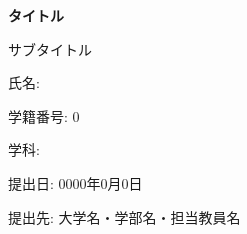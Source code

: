 \documentclass[a4paper,12pt]{article}
\begin{document}
\begin{titlepage}
    \centering
    
    {\Huge \textbf{タイトル} \par}
    \vspace{1.5cm}

    {\LARGE サブタイトル \par}
    \vspace{2cm}

    \vspace{2cm}

    {\Large
    氏名:  \par
    学籍番号: 0 \par
    学科:  \par}
    \vspace{1.5cm}

    {\Large 提出日: 0000年0月0日 \par}

    \vfill

    {\Large 提出先: 大学名・学部名・担当教員名 \par}
\end{titlepage}
\end{document}
